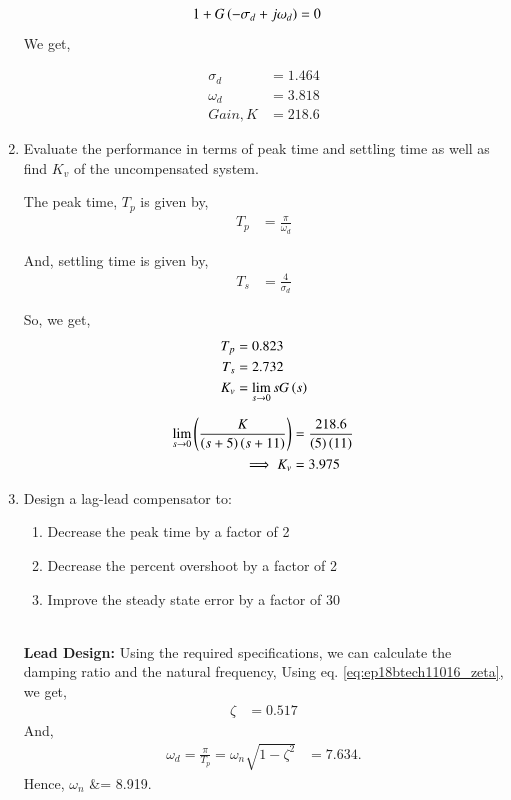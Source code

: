 \begin{enumerate}[label=\thesection.\arabic*.,ref=\thesection.\theenumi]
\begin{align}
    1 + G\left(-\sigma_d + j\omega_d\right) &= 0
\end{align}
We get, 

\begin{align}
    \sigma_d &= 1.464\\
    \omega_d &= 3.818\\
    Gain, K &= 218.6
\end{align}


\item Evaluate the performance in terms of peak time and settling time as well as find $K_v$ of the uncompensated system.\\

\solution

The peak time, $T_p$ is given by,
\begin{align}
    T_p &= \frac{\pi}{\omega_d}
\end{align}

And, settling time is given by,
\begin{align}
    T_s &= \frac{4}{\sigma_d}
\end{align}

So, we get,
\begin{align}
    T_p &= 0.823\\
    T_s &= 2.732\\
    K_v &= \lim_{s \to 0} s G\left(s\right)
\end{align}

\begin{align}
    \lim_{s \to 0} \left(\frac{K}{\left(s+5\right)\left(s+11\right)}\right) &= \frac{218.6}{\left(5\right)\left(11\right)}\\
    \implies K_v &= 3.975
\end{align}


\item Design a lag-lead compensator to:
\begin{enumerate}
    \item Decrease the peak time by a factor of 2
    \item Decrease the percent overshoot by a factor of 2
    \item Improve the steady state error by a factor  of 30
\end{enumerate}

\solution\\
\textbf{Lead Design:}
Using the required specifications, we can calculate the damping ratio and the natural frequency,
Using eq. \ref{eq:ep18btech11016_zeta}, we get,
\begin{align}
    \zeta &= 0.517
\end{align}
And,
\begin{align}
    \omega_d = \frac{\pi}{T_p} = \omega_n\sqrt{1-\zeta^2} &= 7.634.
\end{align}
Hence, $\omega_n$ &= 8.919.


\end{enumerate}
